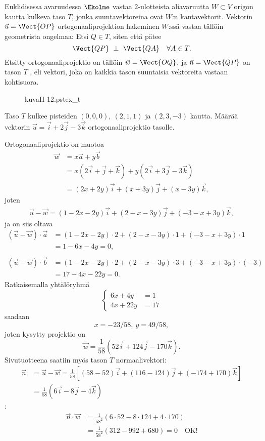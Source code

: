 Euklidisessa avaruudessa $\Ekolme$ vastaa $2$-ulotteista aliavaruutta $W \subset V$ origon
kautta kulkeva taso $T$, jonka suuntavektoreina ovat $W$:n kantavektorit. Vektorin 
$\vec u = \Vect{OP}$ ortogonaaliprojektion hakeminen $W$:ssä vastaa tällöin geometrista
ongelmaa: Etsi $Q \in T$, siten että pätee
\[
\Vect{QP} \ \perp \ \Vect{QA} \quad \forall A \in T.
\]
Etsitty ortogonaaliprojektio on tällöin $\vec w=\Vect{OQ}$, ja $\vec n =\Vect{QP}$ on tason $T$
, eli vektori, joka on kaikkia tason suuntaisia vektoreita vastaan
kohtisuora.
\begin{figure}[H]
\begin{center}
{kuvaII-12.pstex_t}
\end{center}
\end{figure}
\begin{Exa}
Taso $T$ kulkee pisteiden $(0,0,0), \ (2,1,1)$ ja $(2,3,-3)$ kautta. Määrää vektorin 
$\vec u=\vec i +2\vec j -3\vec k$ ortogonaaliprojektio tasolle.
\end{Exa}
\ratk Ortogonaaliprojektio on muotoa 
\begin{align*}
\vec w &= x \vec a +y \vec b \\
&=x(2\vec i + \vec j + \vec k) + y(2\vec i + 3\vec j -3\vec k) \\
&=(2x+2y)\vec i +(x+3y)\vec j+(x-3y)\vec k,
\end{align*}
joten
\begin{align*}
\vec u - \vec w = (1-2x-2y)\vec i + (2-x-3y)\vec j + (-3-x+3y)\vec k,
\end{align*}
ja on siis oltava
\begin{align*}
(\vec u - \vec w) \cdot \vec a &= (1-2x-2y) \cdot 2 + (2-x-3y) \cdot 1 + (-3-x+3y) \cdot 1 \\
                               &=1-6x-4y=0, \\ \\
(\vec u - \vec w) \cdot \vec b &= (1-2x-2y) \cdot 2 + (2-x-3y) \cdot 3 + (-3-x+3y) \cdot (-3) \\
                               &=17-4x-22y=0.
\end{align*}
Ratkaisemalla yhtälöryhmä
\[
\left\{\begin{array}{ll}
6x+4y &= 1 \\
4x+22y &= 17
\end{array}\right.
\]
saadaan
\[
x=-23/58, \ y=49/58,
\]
joten kysytty projektio on 
\[
\vec w = \frac{1}{58}(52\vec i +124\vec j -170\vec k).
\]
Sivutuotteena saatiin myös tason $T$ normaalivektori:
\begin{align*}
\vec n &= \vec u - \vec w 
           = \frac{1}{58}\left[(58-52)\vec i + (116-124)\vec j +(-174+170) \vec k\right] \\
       &= \frac{1}{58}(6\vec i -8\vec j -4\vec k)
\end{align*}
:
\begin{align*}
\vec n \cdot \vec w &= \frac{1}{58^2}(6 \cdot 52 - 8 \cdot 124 + 4 \cdot 170) \\ 
                    &= \frac{1}{58^2}(312-992+680)=0 \quad \text{OK!}
\end{align*}

